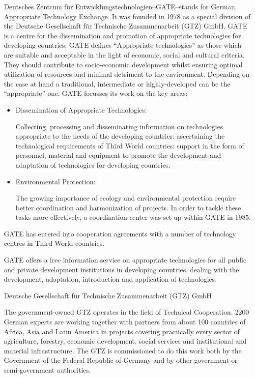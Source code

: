 Deutsches Zentrum f\"{u}r Entwicklungstechnologien--GATE--stands for German 
Appropriate Technology Exchange. It was founded in 1978 as a special division 
of the Deutsche Gesellschaft f\"{u}r Technische Zusammenarbeit (GTZ) GmbH. GATE 
is a 
centre for the dissemination and promotion of appropriate technologies for 
developing countries. GATE defines ``Appropriate technologies'' as those which 
are suitable and acceptable in the light of economic, social and cultural 
criteria. They should contribute to socio-economic development whilst ensuring 
optimal utilization of resources and minimal detriment to the environment. 
Depending on the case at hand a traditional, intermediate or highly-developed 
can be the ``appropriate'' one. GATE focusses its work on the key areas:
\begin{itemize}
\item Dissemination of Appropriate Technologies: 

Collecting, processing and disseminating information on technologies 
appropriate to the needs of the developing countries: ascertaining the 
technological requirements of Third World countries: support in the form of 
personnel, material and equipment to promote the development and adaptation of 
technologies for developing countries.

\item Environmental Protection:

The growing importance of ecology and environmental protection require better 
coordination and harmonization of projects. In order to tackle these tasks more 
effectively, a coordination center was set up within GATE in 1985.
\end{itemize}
GATE has entered into cooperation agreements with a number of technology 
centres in Third World countries.

GATE offers a free information service on appropriate technologies for all 
public and private development institutions in developing countries, dealing 
with the development, adaptation, introduction and application of technologies.

Deutsche Gesellschaft f\"{u}r Technische Zusammenarbeit (GTZ) GmbH

The government-owned GTZ operates in the field of Technical Cooperation. 2200 
German experts are working together with partners from about 100 countries of 
Africa, Asia and Latin America in projects covering practically every sector of 
agriculture, forestry, economic development, social services and institutional 
and material infrastructure. The GTZ is commissioned to do this work both by 
the Government of the Federal Republic of Germany and by other government or 
semi-government authorities.

